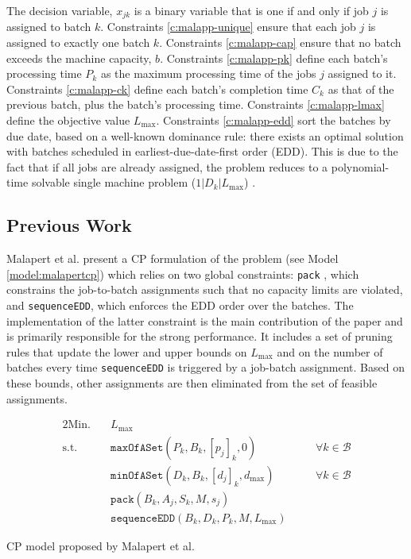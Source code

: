 \documentclass[oribibl]{llncs}
\def\Lmax{{L_{\mathrm{max}}}}
\begin{document}
The decision variable, $x_{jk}$ is a binary variable that is one
if and only if job $j$ is assigned to batch $k$. Constraints
\eqref{c:malapp-unique} ensure that each job $j$ is assigned to exactly
one batch $k$. Constraints \eqref{c:malapp-cap} ensure that no batch
exceeds the machine capacity, $b$. Constraints \eqref{c:malapp-pk}
define each batch's processing time $P_k$ as the maximum processing time
of the jobs $j$ assigned to it. Constraints \eqref{c:malapp-ck} define
each batch's completion time $C_k$ as that of the previous batch, plus
the batch's processing time. Constraints \eqref{c:malapp-lmax} define
the objective value $\Lmax$. Constraints \eqref{c:malapp-edd} sort the
batches by due date, based on a well-known dominance rule: there exists
an optimal solution with batches scheduled in earliest-due-date-first
order (EDD). This is due to the fact that if all jobs are already 
assigned, the problem reduces to a polynomial-time solvable single machine
problem ($1|D_k|\Lmax$) \cite{Pinedo03}.

\subsection{Previous Work}

Malapert et al. \cite{Malapert} present a CP formulation of the problem
(see Model \ref{model:malapertcp}) which relies on two
global constraints: \texttt{pack} \cite{Shaw04a}, which constrains the
job-to-batch assignments such that no capacity limits are violated,
and \texttt{sequenceEDD}, which enforces the EDD order over the batches. The
implementation of the latter constraint is the main contribution of
the paper and is primarily responsible for the strong performance. It
includes a set of pruning rules that update the lower and upper bounds on
$\Lmax$ and on the number of batches every time \texttt{sequenceEDD}
is triggered by a job-batch assignment. Based on these bounds, other
assignments are then eliminated from the set of feasible assignments.

\begin{model}
  \label{model:malapertcp}
  \begin{alignat}{2}
    \mathrm{Min.}\quad & \Lmax &&  \\
    \mathrm{s.t.}\quad \label{c:mcpmax} & \mathtt{maxOfASet}(P_k, B_k, [p_j]_k,
    0) && \quad \forall k \in \mathcal{B} \\
    \label{c:mcpmin} & \mathtt{minOfASet}(D_k, B_k, [d_j]_k, d_\mathrm{max}) &&
    \quad \forall k \in \mathcal{B} \\
    \label{c:mcppack} & \mathtt{pack}(B_k, A_j, S_k, M, s_j) && \\
    \label{c:mcpseq} & \mathtt{sequenceEDD}(B_k, D_k, P_k, M, \Lmax) && 
\end{alignat}
  \caption{CP model proposed by Malapert et al.}
\end{model}
\end{document}
